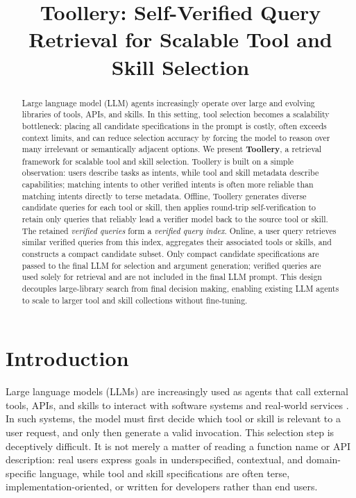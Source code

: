 \title{Toollery: Self-Verified Query Retrieval for Scalable Tool and Skill Selection}


\begin{abstract}
Large language model (LLM) agents increasingly operate over large and evolving libraries of tools, APIs, and skills. In this setting, tool selection becomes a scalability bottleneck: placing all candidate specifications in the prompt is costly, often exceeds context limits, and can reduce selection accuracy by forcing the model to reason over many irrelevant or semantically adjacent options. We present \textbf{Toollery}, a retrieval framework for scalable tool and skill selection. Toollery is built on a simple observation: users describe tasks as intents, while tool and skill metadata describe capabilities; matching intents to other verified intents is often more reliable than matching intents directly to terse metadata. Offline, Toollery generates diverse candidate queries for each tool or skill, then applies round-trip self-verification to retain only queries that reliably lead a verifier model back to the source tool or skill. The retained \emph{verified queries} form a \emph{verified query index}. Online, a user query retrieves similar verified queries from this index, aggregates their associated tools or skills, and constructs a compact candidate subset. Only compact candidate specifications are passed to the final LLM for selection and argument generation; verified queries are used solely for retrieval and are not included in the final LLM prompt. This design decouples large-library search from final decision making, enabling existing LLM agents to scale to larger tool and skill collections without fine-tuning.
\end{abstract}

\section{Introduction}
\label{sec:intro}

Large language models (LLMs) are increasingly used as agents that call external tools, APIs, and skills to interact with software systems and real-world services \citep{schick2023toolformer, qin2023toolllm, patil2024gorilla, yao2022webshop}. In such systems, the model must first decide which tool or skill is relevant to a user request, and only then generate a valid invocation. This selection step is deceptively difficult. It is not merely a matter of reading a function name or API description: real users express goals in underspecified, contextual, and domain-specific language, while tool and skill specifications are often terse, implementation-oriented, or written for developers rather than end users.

